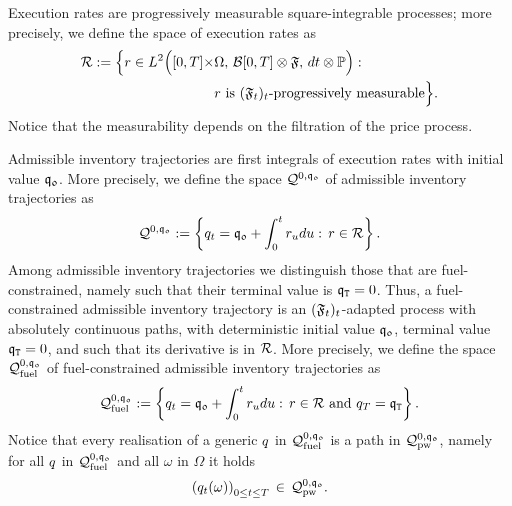 \documentclass[10pt,a4paper]{article}
\begin{document}
Execution rates are progressively measurable square-integrable processes; more precisely, we define the space of execution rates as
\begin{equation}\label{eq.definitionOfSpaceExecutionRates}
\begin{split}
\mathcal{R}:= \Big\lbrace
r \in L^{2}\Big([0,T]\times& \Omega, \, \mathcal{B}[0,T]\otimes \mathfrak{F}, \, dt\otimes {\mathbb{P}}\Big): \, \\
&
r \text{ is } (\mathfrak{F}_t)_t\text{-progressively measurable}\Big\rbrace.
\end{split}
\end{equation}
Notice that the measurability depends on the filtration of the price process. 

Admissible inventory trajectories are first integrals of execution rates with initial value $\mathfrak{q_0}$. More precisely, we define the space $\mathcal{Q}^{0,\mathfrak{q_0}}$ of admissible inventory trajectories as 
\begin{equation}\label{eq.definitionOfSpaceInventoryTrajectories}
\mathcal{Q}^{0,\mathfrak{q_0}} 
:=
\left\lbrace
q_t=\mathfrak{q_0} + \int_{0}^{t}r_u du: \, r \in \mathcal{R}
\right\rbrace.
\end{equation}
Among admissible inventory trajectories we distinguish those that are fuel-constrained, namely such that their terminal value is $\mathfrak{q}_{\mathtt{T} }=0$. Thus, a fuel-constrained admissible inventory trajectory is an $(\mathfrak{F}_t)_t$-adapted process with absolutely continuous paths, with deterministic initial value $\mathfrak{q_0}$,  terminal value $\mathfrak{q}_{\mathtt{T} }=0$, and such that its derivative is in $\mathcal{R}$.  More precisely, we define the space $\mathcal{Q}_{\text{fuel}}^{0,\mathfrak{q_0}}$ of fuel-constrained admissible inventory trajectories as 
\begin{equation*}
\mathcal{Q}_{\text{fuel}}^{0,\mathfrak{q_0}}:= \left\lbrace
q_t=\mathfrak{q_0} + \int_{0}^{t}r_u du: \, r \in \mathcal{R} \text{ and } q_T = \mathfrak{q}_{\mathtt{T} }
\right\rbrace.
\end{equation*}
Notice that every realisation of a generic $q$ in $\mathcal{Q}_{\text{fuel}}^{0,\mathfrak{q_0}}$ is a path in $\mathcal{Q}^{0,\mathfrak{q_0}}_{\text{pw}}$, namely for all $q$ in $\mathcal{Q}_{\text{fuel}}^{0,\mathfrak{q_0}}$ and all $\omega$ in $\Omega$ it holds
\begin{equation*}
\left(q_t(\omega)\right)_{0\leq t \leq T} \, \in \, \mathcal{Q}^{0,\mathfrak{q_0}}_{\text{pw}}.
\end{equation*}
\end{document}
